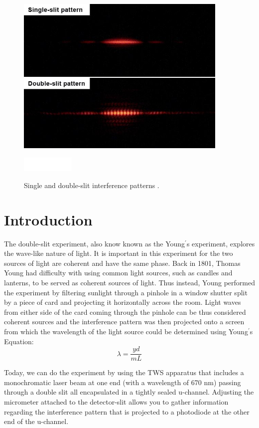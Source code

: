\documentclass[prb,preprint]{revtex4-1}
\begin{document}
\begin{figure}[b]
\centering
\includegraphics[width=4in]{image1.jpg}
\caption{Single and double-slit interference patterns \cite{wik}.}
\includegraphics[width=1in]{white.png}
\label{image}
\end{figure}

\maketitle 

\section{Introduction}
The double-slit experiment, also know known as the Young$^\prime$s experiment, explores the wave-like nature of light. It is important in this experiment for the two sources of light are coherent and have the same phase. Back in 1801, Thomas Young had difficulty with using common light sources, such as candles and lanterns, to be served as coherent sources of light. Thus instead, Young performed the experiment by filtering sunlight through a pinhole in a window shutter split by a piece of card and projecting it horizontally across the room. Light waves from either side of the card coming through the pinhole can be thus considered coherent sources and the interference pattern was then projected onto a screen from which the wavelength of the light source could be determined using Young$^\prime$s Equation: $$\lambda=\frac{y d}{m L}$$

Today, we can do the experiment by using the TWS apparatus that includes a monochromatic laser beam at one end (with a wavelength of 670 nm) passing through a double slit all encapsulated in a tightly sealed u-channel. Adjusting the micrometer attached to the detector-slit allows you to gather information regarding the interference pattern that is projected to a photodiode at the other end of the u-channel.
\end{document}
